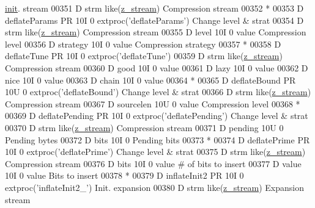 \begin{DoxyCode}
      \hyperlink{structinit}{init}. stream
00351      D  strm                               like(\hyperlink{structz__stream__s}{z\_stream})                       Compression stream
00352       *
00353      D deflateParams   PR            10I 0 extproc('deflateParams')             Change level & strat
00354      D  strm                               like(\hyperlink{structz__stream__s}{z\_stream})                       Compression stream
00355      D  level                        10I 0 value                                Compression level
00356      D  strategy                     10I 0 value                                Compression strategy
00357       *
00358      D deflateTune     PR            10I 0 extproc('deflateTune')
00359      D  strm                               like(\hyperlink{structz__stream__s}{z\_stream})                       Compression stream
00360      D  good                         10I 0 value
00361      D  lazy                         10I 0 value
00362      D  nice                         10I 0 value
00363      D  chain                        10I 0 value
00364       *
00365      D deflateBound    PR            10U 0 extproc('deflateBound')              Change level & strat
00366      D  strm                               like(\hyperlink{structz__stream__s}{z\_stream})                       Compression stream
00367      D  sourcelen                    10U 0 value                                Compression level
00368       *
00369      D deflatePending  PR            10I 0 extproc('deflatePending')            Change level & strat
00370      D  strm                               like(\hyperlink{structz__stream__s}{z\_stream})                       Compression stream
00371      D  pending                      10U 0                                      Pending bytes
00372      D  bits                         10I 0                                      Pending bits
00373       *
00374      D deflatePrime    PR            10I 0 extproc('deflatePrime')              Change level & strat
00375      D  strm                               like(\hyperlink{structz__stream__s}{z\_stream})                       Compression stream
00376      D  bits                         10I 0 value                                \textcolor{preprocessor}{# of bits to insert}
00377      D  value                        10I 0 value                                Bits to insert
00378       *
00379      D inflateInit2    PR            10I 0 extproc(\textcolor{stringliteral}{'inflateInit2\_'})             Init. expansion
00380      D  strm                               like(\hyperlink{structz__stream__s}{z\_stream})                       Expansion stream

\end{DoxyCode}
